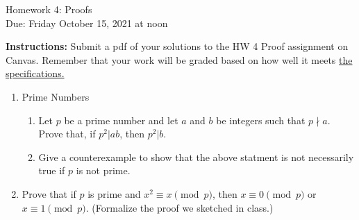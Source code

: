 \documentclass[10pt,a4paper]{article}
\begin{document}
\begin{center}
{\Large Homework 4: Proofs}\\
Due: Friday October 15, 2021 at noon\\


\end{center}
{\bf Instructions:} Submit a pdf of your solutions to the HW 4 Proof assignment on Canvas. Remember that your work will be graded based on how well it meets \href{https://docs.google.com/document/d/1emM06_WRh_h941rsjtRE9fRVndJtfRKd9gyS3Fs_rFA/edit?usp=sharing}{the specifications. }

\begin{enumerate}

 \item Prime Numbers
\begin{enumerate}
\item Let $p$ be a prime number and let $a$ and $b$ be integers such that $p\nmid a$. Prove that, if $p^2|ab$, then $p^2|b$. 
\item Give a counterexample to show that the above statment is not necessarily true if $p$ is not prime. 
\end{enumerate}
\item  Prove that if $p$ is prime and $x^2\equiv x \pmod{p}$, then $x\equiv 0\pmod{p}$ or $x\equiv 1\pmod{p}$. (Formalize the proof we sketched in class.)

\end{enumerate}
\end{document}
